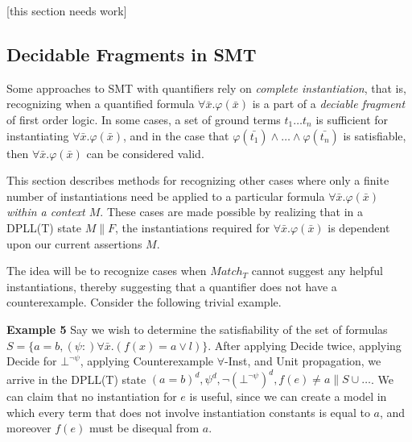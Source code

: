 \documentclass{llncs}
\begin{document}
[this section needs work]

\subsection{Decidable Fragments in SMT}

Some approaches to SMT with quantifiers rely on \emph{complete instantiation}, that is, recognizing when a quantified formula $\forall \bar{ x }. \varphi( \bar{ x } )$ is a part of a \emph{deciable fragment} of first order logic.
In some cases, a set of ground terms $t_1 \ldots t_n$ is sufficient for instantiating $\forall \bar{ x }. \varphi( \bar{ x } )$, and in the case that $\varphi( \bar{ t_1 } ) \wedge \ldots \wedge \varphi( \bar{ t_n } )$ is satisfiable, then $\forall \bar{ x }. \varphi( \bar{ x } )$ can be considered valid.

This section describes methods for recognizing other cases where only a finite number of instantiations need be applied to a particular formula $\forall \bar{ x }. \varphi( \bar{ x } )$ \emph{within a context $M$}.
These cases are made possible by realizing that in a DPLL(T) state $M \parallel F$, the instantiations required for $\forall \bar{ x }. \varphi( \bar{ x } )$ is dependent upon our current assertions $M$.


The idea will be to recognize cases when $Match_T$ cannot suggest any helpful instantiations, thereby suggesting that a quantifier does not have a counterexample.
Consider the following trivial example.

{\bf Example 5}
Say we wish to determine the satisfiability of the set of formulas $S = \{ a = b, (\psi :) \forall \bar{x}. (f( x ) = a \vee l) \}$.
After applying Decide twice, applying Decide for $\bot^{\neg \psi}$, applying Counterexample $\forall$-Inst, and Unit propagation, we arrive in the DPLL(T) state $(a=b)^d, \psi^d, \neg ( \bot^{\neg \psi} )^d, f( e ) \neq a \parallel S \cup \ldots$.
We can claim that no instantiation for $e$ is useful, since we can create a model in which every term that does not involve instantiation constants is equal to $a$, and moreover $f(e)$ must be disequal from $a$.
\end{document}
